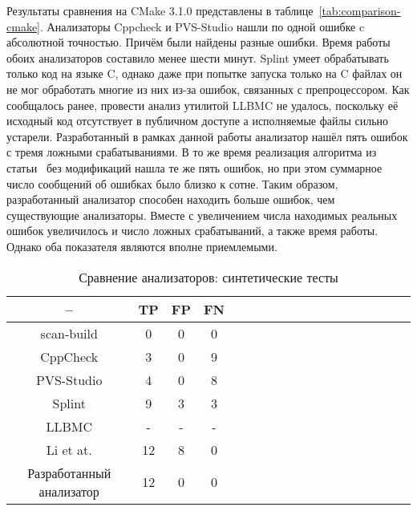 Результаты сравнения на CMake 3.1.0 представлены в
таблице~\ref{tab:comparison-cmake}. Анализаторы Cppcheck и PVS-Studio
нашли по одной ошибке c абсолютной точностью. Причём были найдены
разные ошибки. Время работы обоих анализаторов составило менее шести
минут. Splint умеет обрабатывать только код на языке C, однако даже
при попытке запуска только на C файлах он не мог обработать многие из
них из-за ошибок, связанных с препроцессором. Как сообщалось ранее,
провести анализ утилитой LLBMC не удалось, поскольку её исходный код
отсутствует в публичном доступе а исполняемые файлы сильно
устарели. Разработанный в рамках данной работы анализатор нашёл пять
ошибок с тремя ложными срабатываниями. В то же время реализация
алгоритма из статьи~\cite{li2010practical} без модификаций нашла те же
пять ошибок, но при этом суммарное число сообщений об ошибках было
близко к сотне. Таким образом, разработанный анализатор способен
находить больше ошибок, чем существующие анализаторы. Вместе с
увеличением числа находимых реальных ошибок увеличилось и число ложных
срабатываний, а также время работы. Однако оба показателя являются
вполне приемлемыми.

\begin{table}[!h]
\caption{Сравнение анализаторов: синтетические тесты}\label{tab:comparison-synthetic}
\centering
  \begin{tabular}{|*{18}{c|}}\hline
  --                       & TP  & FP & FN \\\hline
  scan-build               & 0   & 0  & 0  \\\hline
  CppCheck                 & 3   & 0  & 9  \\\hline
  PVS-Studio               & 4   & 0  & 8  \\\hline
  Splint                   & 9   & 3  & 3  \\\hline
  LLBMC                    & -   & -  & -  \\\hline
  Li et at.                & 12  & 8  & 0  \\\hline
  Разработанный анализатор & 12  & 0  & 0  \\\hline
  \end{tabular}
\end{table}

